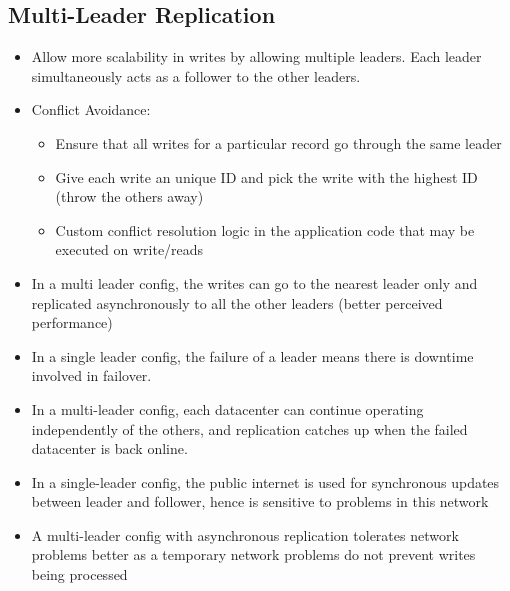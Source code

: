 \documentclass{article}
\begin{document}
\subsection{Multi-Leader Replication}
\begin{itemize}
    \item Allow more scalability in writes by allowing multiple leaders. Each leader simultaneously acts as a follower to the other leaders.
    
    \item Conflict Avoidance:
    \begin{itemize}
        \item Ensure that all writes for a particular record go through the same leader
        
        \item Give each write an unique ID and pick the write with the highest ID (throw the others away)
        
        \item Custom conflict resolution logic in the application code that  may be executed on write/reads
    \end{itemize}
    
    \item In a multi leader config, the writes can go to the nearest leader only and replicated asynchronously to all the other leaders (better perceived performance)
    
    \item In a single leader config, the failure of a leader means there is downtime involved in failover. 
    
    \item In a multi-leader config, each datacenter can continue operating independently of the others, and replication catches up when the failed datacenter is back online. 
    
    \item In a single-leader config, the public internet is used for synchronous updates between leader and follower, hence is sensitive to problems in this network
    
    \item A multi-leader config with asynchronous replication tolerates network problems better as a temporary network problems do not prevent writes being processed
\end{itemize}
\end{document}
